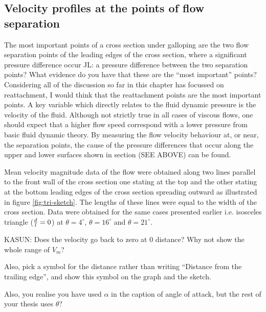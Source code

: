 \subsection{Velocity profiles at the points of flow separation}

The most important points of a cross section under galloping are the two flow separation points of the leading edges of the cross section, where a significant pressure difference occur JL: a pressure difference between the two separation points? What evidence do you have that these are the ``most important'' points? Considering all of the discussion so far in this chapter has focussed on reattachment, I would think that the reattachment points are the most important points. A key variable which directly relates to the fluid dynamic pressure is the velocity of the fluid. Although not strictly true in all cases of viscous flows, one should expect that a higher flow speed correspond with a lower pressure from basic fluid dynamic theory. By measuring the flow velocity behaviour at, or near, the separation points, the cause of the pressure differences that occur along the upper and lower surfaces shown in section (SEE ABOVE) can be found.


   
Mean velocity magnitude data of the flow were obtained along two lines parallel to the front wall of the cross section one stating at the top and the other stating at the bottom leading edges of the cross section spreading outward as illustrated in figure \ref{fig:tri-sketch}. The lengths of these lines were equal to the width of the cross section. Data were obtained for the same cases presented earlier i.e. isosceles triangle ($\frac{d}{l}=0$) at $\theta=4^{\circ}$, $\theta=16^{\circ}$ and $\theta=21^{\circ}$.
       


KASUN: Does the velocity go back to zero at 0 distance? Why not show
the whole range of $V_m$?

Also, pick a symbol for the distance rather than writing ``Distance
from the trailing edge'', and show this symbol on the graph and the
sketch.

Also, you realise you have used $\alpha$ in the caption of angle of
attack, but the rest of your thesis uses $\theta$?

